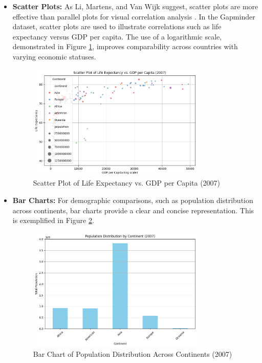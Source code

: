 \begin{itemize}
    \item \textbf{Scatter Plots:} As Li, Martens, and Van Wijk suggest, scatter plots are more effective than parallel plots for visual correlation analysis \cite{liJudgingCorrelationScatterplots2010}. In the Gapminder dataset, scatter plots are used to illustrate correlations such as life expectancy versus GDP per capita. The use of a logarithmic scale, demonstrated in Figure \ref{fig:lo3_scatterplot}, improves comparability across countries with varying economic statuses.

    \begin{figure}[h]
        \centering
        \includegraphics[width=0.8\textwidth]{images/plots/lo3_scatterplot.png} 
        \caption{Scatter Plot of Life Expectancy vs. GDP per Capita (2007)}
        \label{fig:lo3_scatterplot}
    \end{figure}

    \item \textbf{Bar Charts:} For demographic comparisons, such as population distribution across continents, bar charts provide a clear and concise representation. This is exemplified in Figure \ref{fig:lo3_barchart}.

    \begin{figure}[h]
        \centering
        \includegraphics[width=0.8\textwidth]{images/plots/lo3_barplot.png} 
        \caption{Bar Chart of Population Distribution Across Continents (2007)}
        \label{fig:lo3_barchart}
    \end{figure}


\end{itemize}
